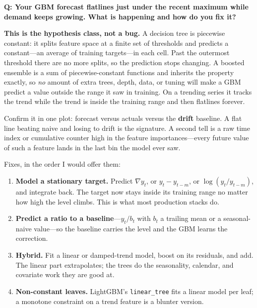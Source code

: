 \begin{interviewq}
\textbf{Q: Your GBM forecast flatlines just under the recent maximum while demand keeps growing. What is happening and how do you fix it?}

 \quad {} \quad \badgefreq{\freqhigh}

\stronganswer

\textbf{This is the hypothesis class, not a bug.} A decision tree is piecewise constant: it splits feature space at a finite set of thresholds and predicts a constant---an average of training targets---in each cell. Past the outermost threshold there are no more splits, so the prediction stops changing. A boosted ensemble is a sum of piecewise-constant functions and inherits the property exactly, so \emph{no} amount of extra trees, depth, data, or tuning will make a GBM predict a value outside the range it saw in training. On a trending series it tracks the trend while the trend is inside the training range and then flatlines forever.

Confirm it in one plot: forecast versus actuals versus the \textbf{drift} baseline. A flat line beating naive and losing to drift is the signature. A second tell is a raw time index or cumulative counter high in the feature importances---every future value of such a feature lands in the last bin the model ever saw.

Fixes, in the order I would offer them:
\begin{enumerate}
    \item \textbf{Model a stationary target.} Predict $\nabla y_t$, or $y_t - y_{t-m}$, or $\log(y_t/y_{t-m})$, and integrate back. The target now stays inside its training range no matter how high the level climbs. This is what most production stacks do.
    \item \textbf{Predict a ratio to a baseline}---$y_t / b_t$ with $b_t$ a trailing mean or a seasonal-naive value---so the baseline carries the level and the GBM learns the correction.
    \item \textbf{Hybrid.} Fit a linear or damped-trend model, boost on its residuals, and add. The linear part extrapolates; the trees do the seasonality, calendar, and covariate work they are good at.
    \item \textbf{Non-constant leaves.} LightGBM's \texttt{linear\_tree} fits a linear model per leaf; a monotone constraint on a trend feature is a blunter version.
\end{enumerate}


\end{interviewq}
